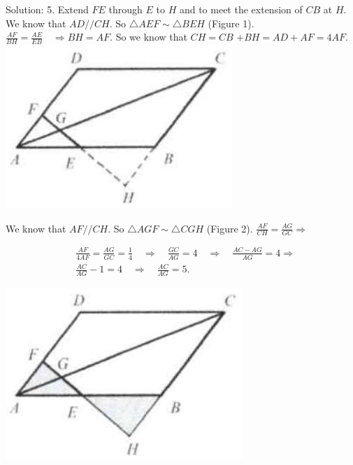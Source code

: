 \documentclass[10pt]{article}
\begin{document}
Solution: 5.
Extend \(F E\) through \(E\) to \(H\) and to meet the extension of \(C B\) at \(H\).\\
We know that \(A D / / C H\). So \(\triangle A E F \sim \triangle B E H\) (Figure 1). \(\frac{A F}{B H}=\frac{A E}{E B} \quad \Rightarrow B H=A F\). So we know that \(C H=C B\) \(+B H=A D+A F=4 A F\).\\
\includegraphics[max width=\textwidth, center]{2025_04_17_97bc1f7e44d93c271a88g-123(1)}

We know that \(A F / / C H\). So \(\triangle A G F \sim \triangle C G H\) (Figure 2). \(\frac{A F}{C H}=\frac{A G}{G C} \Rightarrow\)

\[
\begin{aligned}
& \frac{A F}{4 A F}=\frac{A G}{G C}=\frac{1}{4} \quad \Rightarrow \quad \frac{G C}{A G}=4 \quad \Rightarrow \quad \frac{A C-A G}{A G}=4 \Rightarrow \\
& \frac{A C}{A G}-1=4 \quad \Rightarrow \quad \frac{A C}{A G}=5 .
\end{aligned}
\]

\begin{center}
\includegraphics[max width=\textwidth]{2025_04_17_97bc1f7e44d93c271a88g-124}
\end{center}
\end{document}
